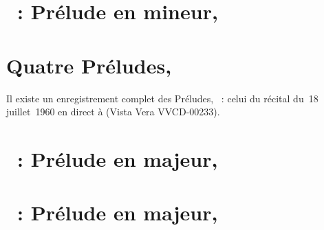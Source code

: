 \section{\ifChrono \Scriabine{}~: \fi
Prélude en \kG mineur,  }
\label{\thesection}

\begin{workitemize}
 \item{}
 \begin{perfitemize}
  \item{}
 \end{perfitemize}
 \item{}
 \begin{perfitemize}
  \item{}
 \end{perfitemize}
\end{workitemize}

\section*{%
Quatre Préludes, }

Il existe un enregistrement complet des Préludes, ~: celui du
récital du~18 juillet~1960 en direct à \MSHM (Vista Vera VVCD-00233).

\section{\ifChrono \Scriabine{}~: \fi
Prélude en \kF \Sharp majeur,  }
\label{\thesection}

\begin{workitemize}
 \item{}
 \begin{perfitemize}
  \item{}
 \end{perfitemize}
\end{workitemize}

\section{\ifChrono \Scriabine{}~: \fi
Prélude en \kD majeur,  }
\label{\thesection}

